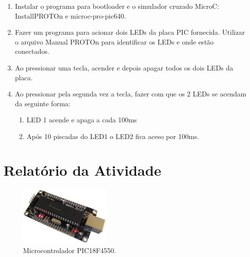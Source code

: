 \documentclass[
	12pt,				%
	openright,			%
  oneside,     %
	a4paper,			%
	english,			%
	french,				%
	spanish,			%
	brazil				%
	]{abntex2}
\begin{document}
\begin{enumerate}
  \item Instalar o programa para bootloader e o simulador cruzado MicroC: InstallPROTOn e microc-pro-pic640. 
  \item Fazer um programa para acionar dois LEDs da placa PIC fornecida. Utilizar o arquivo Manual PROTOn para identificar os LEDs e onde estão conectados.
  \item Ao pressionar uma tecla, acender e depois apagar todos os dois LEDs da placa.
  \item Ao pressionar pela segunda vez a tecla, fazer com que os 2 LEDs se acendam da seguinte forma:
  \begin{enumerate}
    \item LED 1 acende e apaga a cada 100ms
    \item Após 10 piscadas do LED1 o LED2 fica aceso por 100ms.
  \end{enumerate}
\end{enumerate}


\section{Relatório da Atividade} %
\label{sec:consideracoes-PIC}

\begin{figure}[ht]
  \centering
  \caption{\label{fig:03MicrocontrollerPIC_18F4550}Microcontrolador PIC18F4550.} 
  \includegraphics[width=0.4\textwidth]{images/Atividade03/PicPROTOn-45o-450-2-450px.jpg}
\end{figure}
\end{document}
